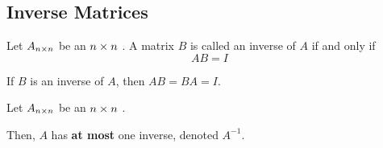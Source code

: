 \subsection{Inverse Matrices}\label{subsec:Inverse_Matrices}
\begin{definition}\label{def:Inverse_Matrix}
  Let $A_{n \times n}$ be an $n \times n$ .
  A matrix $B$ is called an inverse of $A$ if and only if
  \begin{equation}\label{eq:Inverse_Matrix}
    AB = I
  \end{equation}
\end{definition}

\begin{theorem}\label{thm:Inverse_Matrix_Commutativity}
  If $B$ is an inverse of $A$, then $AB = BA = I$.
\end{theorem}

\begin{theorem}\label{thm:Inverse_Matrix_Uniqueness}
  Let $A_{n \times n}$ be an $n \times n$ .

  Then, $A$ has \textbf{at most} one inverse, denoted $A^{-1}$.
\end{theorem}

